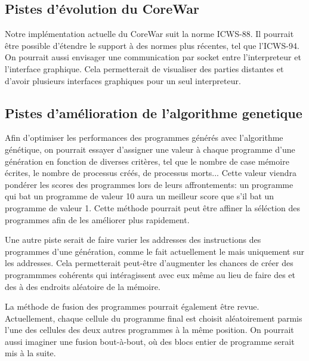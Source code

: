 \documentclass[a4paper,12pt]{article} %
\begin{document}
\subsection{Pistes d'évolution du CoreWar}
Notre implémentation actuelle du CoreWar suit la norme ICWS-88. Il pourrait être possible d'étendre le support à des normes plus récentes, tel que l'ICWS-94. On pourrait aussi envisager une communication par socket entre l'interpreteur et l'interface graphique. Cela permetterait de visualiser des parties distantes et d'avoir plusieurs interfaces graphiques pour un seul interpreteur.

\subsection{Pistes d'amélioration de l'algorithme genetique}
Afin d'optimiser les performances des programmes générés avec l'algorithme génétique, on pourrait essayer d'assigner une valeur à chaque programme d'une génération en fonction de diverses critères, tel que le nombre de case mémoire écrites, le nombre de processus créés, de processus morts... Cette valeur viendra pondérer les scores des programmes lors de leurs affrontements: un programme qui bat un programme de valeur 10 aura un meilleur score que s'il bat un programme de valeur 1. Cette méthode pourrait peut être affiner la séléction des programmes afin de les améliorer plus rapidement.

Une autre piste serait de faire varier les addresses des instructions des programmes d'une génération, comme le fait actuellement le  mais uniquement sur les addresses. Cela permetterait peut-être d'augmenter les chances de créer des programmmes cohérents qui intéragissent avec eux même au lieu de faire des  et des  à des endroits aléatoire de la mémoire.

La méthode de fusion des programmes pourrait également être revue. Actuellement, chaque cellule du programme final est choisit aléatoirement parmis l'une des cellules des deux autres programmes à la même position. On pourrait aussi imaginer une fusion bout-à-bout, où des blocs entier de programme serait mis à la suite.
\end{document}
